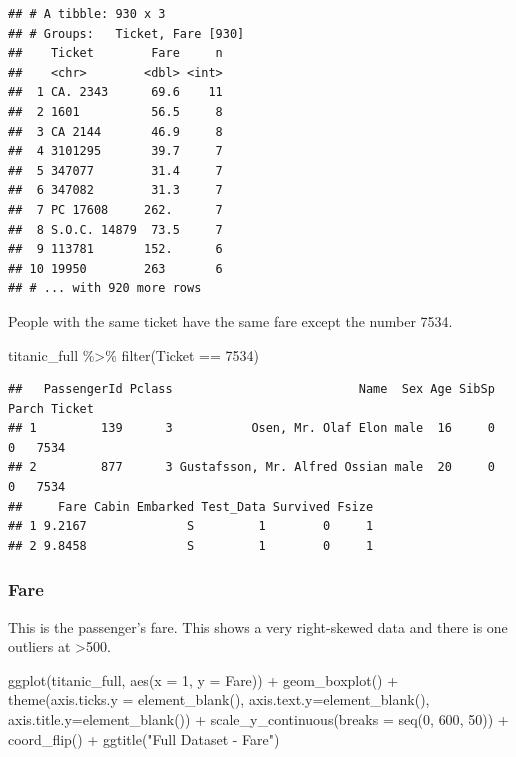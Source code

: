 \documentclass[
]{article}
\newenvironment{Shaded}{\begin{snugshade}}{\end{snugshade}}
\newcommand{\AttributeTok}[1]{\textcolor[rgb]{0.77,0.63,0.00}{#1}}
\newcommand{\DecValTok}[1]{\textcolor[rgb]{0.00,0.00,0.81}{#1}}
\newcommand{\FunctionTok}[1]{\textcolor[rgb]{0.00,0.00,0.00}{#1}}
\newcommand{\NormalTok}[1]{#1}
\newcommand{\SpecialCharTok}[1]{\textcolor[rgb]{0.00,0.00,0.00}{#1}}
\newcommand{\StringTok}[1]{\textcolor[rgb]{0.31,0.60,0.02}{#1}}
\begin{document}
\begin{verbatim}
## # A tibble: 930 x 3
## # Groups:   Ticket, Fare [930]
##    Ticket        Fare     n
##    <chr>        <dbl> <int>
##  1 CA. 2343      69.6    11
##  2 1601          56.5     8
##  3 CA 2144       46.9     8
##  4 3101295       39.7     7
##  5 347077        31.4     7
##  6 347082        31.3     7
##  7 PC 17608     262.      7
##  8 S.O.C. 14879  73.5     7
##  9 113781       152.      6
## 10 19950        263       6
## # ... with 920 more rows
\end{verbatim}

People with the same ticket have the same fare except the number 7534.

\begin{Shaded}
\begin{Highlighting}[]
\NormalTok{titanic\_full }\SpecialCharTok{\%\textgreater{}\%}
  \FunctionTok{filter}\NormalTok{(Ticket }\SpecialCharTok{==} \StringTok{\textquotesingle{}7534\textquotesingle{}}\NormalTok{)}
\end{Highlighting}
\end{Shaded}

\begin{verbatim}
##   PassengerId Pclass                          Name  Sex Age SibSp Parch Ticket
## 1         139      3           Osen, Mr. Olaf Elon male  16     0     0   7534
## 2         877      3 Gustafsson, Mr. Alfred Ossian male  20     0     0   7534
##     Fare Cabin Embarked Test_Data Survived Fsize
## 1 9.2167              S         1        0     1
## 2 9.8458              S         1        0     1
\end{verbatim}

\hypertarget{fare}{%
\subsubsection{\texorpdfstring{\textbf{Fare}}{Fare}}\label{fare}}

This is the passenger's fare. This shows a very right-skewed data and
there is one outliers at \textgreater500.

\begin{Shaded}
\begin{Highlighting}[]
\FunctionTok{ggplot}\NormalTok{(titanic\_full, }\FunctionTok{aes}\NormalTok{(}\AttributeTok{x =} \DecValTok{1}\NormalTok{, }\AttributeTok{y =}\NormalTok{ Fare)) }\SpecialCharTok{+} 
  \FunctionTok{geom\_boxplot}\NormalTok{() }\SpecialCharTok{+} 
  \FunctionTok{theme}\NormalTok{(}\AttributeTok{axis.ticks.y =} \FunctionTok{element\_blank}\NormalTok{(), }
        \AttributeTok{axis.text.y=}\FunctionTok{element\_blank}\NormalTok{(), }
        \AttributeTok{axis.title.y=}\FunctionTok{element\_blank}\NormalTok{()) }\SpecialCharTok{+} 
  \FunctionTok{scale\_y\_continuous}\NormalTok{(}\AttributeTok{breaks =} \FunctionTok{seq}\NormalTok{(}\DecValTok{0}\NormalTok{, }\DecValTok{600}\NormalTok{, }\DecValTok{50}\NormalTok{)) }\SpecialCharTok{+} 
  \FunctionTok{coord\_flip}\NormalTok{() }\SpecialCharTok{+} 
  \FunctionTok{ggtitle}\NormalTok{(}\StringTok{"Full Dataset {-} Fare"}\NormalTok{)}
\end{Highlighting}
\end{Shaded}
\end{document}
